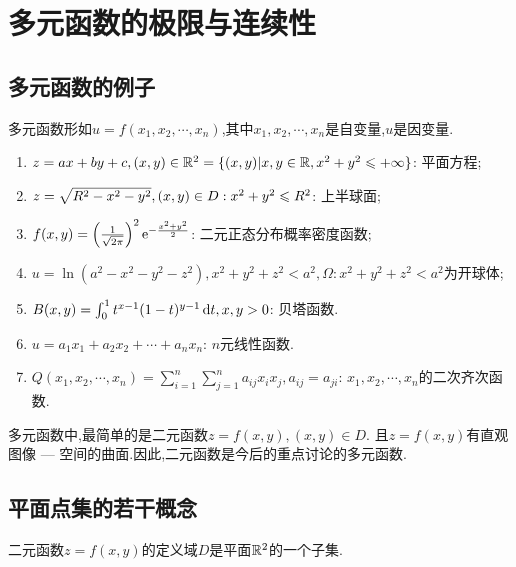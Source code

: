\setcounter{chapter}{5}
\chapter{多元函数的极限与连续性}

\section{多元函数的例子}

多元函数形如$u = f(x_1,x_2,\cdots,x_n)$,其中$x_1,x_2,\cdots,x_n$是自变量,$u$是因变量.

\begin{enumerate}
    \item $z = ax+by+c, (x,y) \in \mathbb{R}^2 = \{ (x,y) | x,y \in \mathbb{R}, x^2 + y^2 \leqslant +\infty \}$: 平面方程;
    \item $z = \sqrt{R^2 - x^2-y^2}, (x,y) \in D: x^2 + y^2 \leqslant R^2$: 上半球面;
    \item $f(x,y) = \left( \frac{1}{\sqrt{2\pi}} \right)^2 \mathrm{e}^{-\frac{x^2+y^2}{2}}$: 二元正态分布概率密度函数;
    \item $u = \ln(a^2 - x^2-y^2-z^2), x^2+y^2+z^2 < a^2, \Omega: x^2+y^2+z^2 < a^2$为开球体;
    \item $B(x,y) = \int_0^1 t^{x-1} (1-t)^{y-1} \operatorname{d\!} t, x,y > 0$: 贝塔函数.
    \item $u = a_1 x_1 + a_2 x_2 + \cdots + a_n x_n$: $n$元线性函数.
    \item $Q(x_1,x_2,\cdots,x_n) = \sum_{i=1}^n \sum_{j=1}^n a_{ij} x_i x_j, a_{ij} = a_{ji}$: $x_1,x_2,\cdots,x_n$的二次齐次函数.
\end{enumerate}

多元函数中,最简单的是二元函数$z=f(x,y), (x,y) \in D.$ 且$z = f(x,y)$有直观图像 --- 空间的曲面.因此,二元函数是今后的重点讨论的多元函数.

\section{平面点集的若干概念}

二元函数$z = f(x,y)$的定义域$D$是平面$\mathbb{R}^2$的一个子集.

